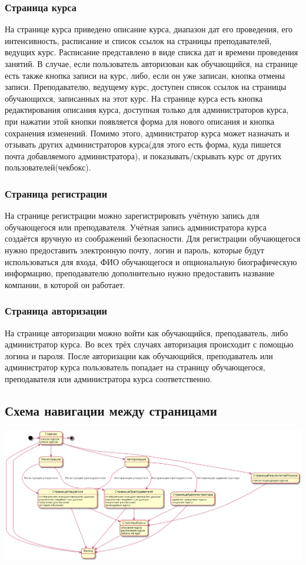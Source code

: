 \documentclass[11pt]{article}
\begin{document}
\subsubsection{Страница курса}
\label{sec:org3bc4214}
На странице курса приведено описание курса, диапазон дат его проведения, его интенсивность,
расписание и список ссылок на страницы преподавателей, ведущих курс.
Расписание представлено в виде списка дат и времени проведения занятий. В случае, если пользователь авторизован как
обучающийся, на странице есть также кнопка записи на курс, либо, если он уже записан, кнопка отмены записи.
Преподавателю, ведущему курс, доступен список ссылок на страницы обучающихся,
записанных на этот курс.
На странице курса есть кнопка редактирования описания курса, доступная только для администраторов курса, при нажатии
этой кнопки появляется форма для нового описания и кнопка сохранения изменений. Помимо этого, администратор курса
может назначать и отзывать других администраторов курса(для этого есть форма, куда пишется почта
добавляемого администратора), и показывать/скрывать курс от других пользователей(чекбокс).
\subsubsection{Страница регистрации}
\label{sec:org6d83269}
На странице регистрации можно зарегистрировать учётную запись для обучающегося или преподавателя.
Учётная запись администратора курса создаётся вручную из соображений безопасности.
Для регистрации обучающегося нужно предоставить электронную почту, логин и пароль, которые
будут использоваться для входа, ФИО обучающегося и опциональную биографическую информацию,
преподавателю дополнительно нужно предоставить название компании, в которой он работает.
\subsubsection{Страница авторизации}
\label{sec:org8467e01}
На странице авторизации можно войти как обучающийся, преподаватель, либо администратор курса.
Во всех трёх случаях авторизация происходит с помощью логина и пароля. После авторизации как
обучающийся, преподаватель или администратор курса пользователь попадает на страницу
обучающегося, преподавателя или администратора курса соответственно.
\subsection{Схема навигации между страницами}
\label{sec:orgc8e3a86}
\begin{center}
\includegraphics[width=.9\linewidth]{pages.png}
\end{center}
\end{document}

